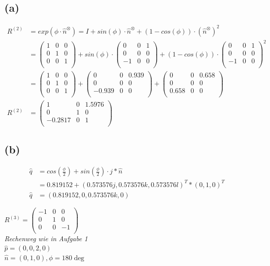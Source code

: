 \documentclass{../Vorlage/mat}
\begin{document}
\subsection*{(a)}
\begin{align*}
R^{(2)} & = exp(\phi \cdot \hat{n}^\otimes) = I + sin(\phi) \cdot \hat{n}^\otimes + (1 - cos(\phi)) \cdot (\hat{n}^\otimes)^2\\
& = 
\begin{pmatrix}
1 & 0 & 0 \\
0 & 1 & 0\\
0 & 0 & 1 \\
\end{pmatrix} + sin(\phi) \cdot
\begin{pmatrix}
0 & 0 & 1 \\
0 & 0 & 0 \\
-1 & 0 & 0 \\
\end{pmatrix} + (1 - cos(\phi)) \cdot
\begin{pmatrix}
0 & 0 & 1 \\   
0 & 0 & 0 \\
-1 & 0 & 0 \\
\end{pmatrix}^2 						\\
& = 
\begin{pmatrix}
1 & 0 & 0 \\
0 & 1 & 0\\
0 & 0 & 1 \\
\end{pmatrix} +
\begin{pmatrix}
0 & 0 & 0.939 \\
0 & 0 & 0 \\
-0.939 & 0 & 0 \\
\end{pmatrix} + 
\begin{pmatrix}
0 & 0 & 0.658 \\   
0 & 0 & 0 \\
0.658 & 0 & 0 \\
\end{pmatrix} 						\\
R^{(2)} & =  
\begin{pmatrix}
1 & 0 & 1.5976 \\
0 & 1 & 0\\
-0.2817 & 0 & 1 \\
\end{pmatrix}
\end{align*}
\subsection*{(b)}
\begin{align*}
\hat{q} & = cos(\frac{\phi}{2}) + sin(\frac{\phi}{2}) \cdot j * \hat{n}\\
& = 0.819152 + (0.573576j,0.573576k,0.573576l)^T * (0,1,0)^T\\
\hat{q} & = (0.819152, 0, 0.573576k, 0)
\end{align*}

$R^{(3)} = \begin{pmatrix}
-1 & 0 & 0 \\
0 & 1 & 0\\
0 & 0 & -1\\
\end{pmatrix}
$\\
\textit{Rechenweg wie in Aufgabe 1}\\
$\hat{p} = \left(0,0,2,0\right)$\\
$\hat{n} =(0,1,0) , \phi = 180\deg$
\end{document}
